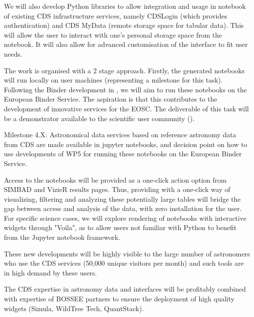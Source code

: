 \begin{task}[
  title=Astronomy application,
  id=astro,
  lead=CDS,
  PM=18,
  wphases={0-48},
  partners={QS,WTT,SRL,INSERM,XFEL}
]
  We will also develop Python libraries to allow integration and usage in
  notebook of existing CDS infrastructure services, namely CDSLogin (which
  provides authentication) and CDS MyData (remote storage space for tabular
  data).
  This will allow the user to interact with one's personal storage space from
  the notebook. It will also allow for advanced customisation of the interface 
  to fit user needs.

  The work is organised with a 2 stage approach. Firstly, the generated 
  notebooks will run locally on user machines (representing a milestone for 
  this task). Following the Binder development in , we will aim 
  to run these notebooks on the European Binder Service. The aspiration is 
  that this contributes to the development of innovative services for the EOSC.
  The deliverable of this task will be a demonstrator available to the 
  scientific user community ().

  Milestone 4.X: Astronomical data services based on reference astronomy data from CDS are made available in jupyter notebooks, and decision point on how to use developments of WP5 for running these notebooks on the European Binder Service.



  Access to the notebooks will be provided as a one-click action option from
  SIMBAD and VizieR results pages.
  Thus, providing with a one-click way of visualizing, filtering and analyzing
these potentially large tables will bridge the gap between access and analysis
of the data, with zero installation for the user.
  For specific science cases, we will explore rendering of notebooks with 
  interactive widgets through "Voila", as to allow users not familiar with 
  Python to benefit from the Jupyter notebook framework.

  These new developments will be highly visible to the large number of astronomers who use the CDS services (50,000 unique visitors per month) and such tools are in high demand by these users.

  The CDS expertise in astronomy data and interfaces will be profitably combined with expertise of BOSSEE partners to ensure the deployment of high quality widgets (Simula, WildTree Tech, QuantStack).



\end{task}
